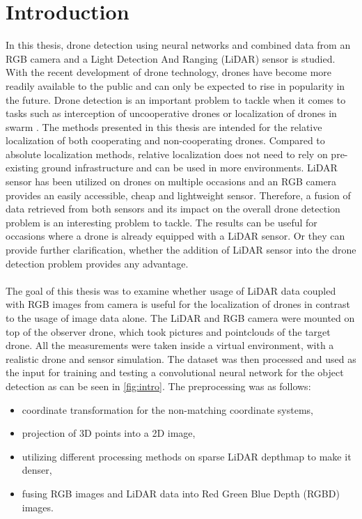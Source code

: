 \documentclass[twoside]{ctuthesis}
\theoremstyle{plain}
\theoremstyle{definition}
\theoremstyle{note}
\begin{document}
\maketitle
\chapter{Introduction}
In this thesis, drone detection using neural networks and combined data from an RGB camera and a Light Detection And Ranging (LiDAR) sensor is studied. With the recent development of drone technology, drones have become more readily available to the public and can only be expected to rise in popularity in the future. Drone detection is an important problem to tackle when it comes to tasks such as interception of uncooperative drones \cite{cite:1} or localization of drones in swarm \cite{cite:2} \cite{cite:3}. The methods presented in this thesis are intended for the relative localization of both cooperating and non-cooperating drones. Compared to absolute localization methods, relative localization does not need to rely on pre-existing ground infrastructure and can be used in more environments. LiDAR sensor has been utilized on drones on multiple occasions \cite{cite:4} \cite{9553611} \cite{9554023} and an RGB camera provides an easily accessible, cheap and lightweight sensor. Therefore, a fusion of data retrieved from both sensors and its impact on the overall drone detection problem is an interesting problem to tackle. The results can be useful for occasions where a drone is already equipped with a LiDAR sensor. Or they can provide further clarification, whether the addition of LiDAR sensor into the drone detection problem provides any advantage.\\
\\
The goal of this thesis was to examine whether usage of LiDAR data coupled with RGB images from camera is useful for the localization of drones in contrast to the usage of image data alone. The LiDAR and RGB camera were mounted on top of the observer drone, which took pictures and pointclouds of the target drone. All the measurements were taken inside a virtual environment, with a realistic drone and sensor simulation. The dataset was then processed and used as the input for training and testing a convolutional neural network for the object detection as can be seen in \autoref{fig:intro}. The preprocessing was as follows:
\begin{itemize}
	\item coordinate transformation for the non-matching coordinate systems,
	\item projection of 3D points into a 2D image,
	\item utilizing different processing methods on sparse LiDAR depthmap to make it denser,
	\item fusing RGB images and LiDAR data into Red Green Blue Depth (RGBD) images.
\end{itemize}
\end{document}

